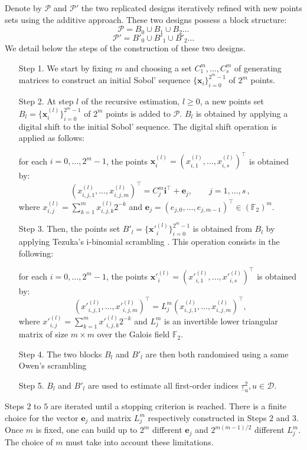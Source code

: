 \documentclass[]{elsarticle}
\theoremstyle{definition}
\newcommand{\bvec}[1]{\boldsymbol{#1}}
\newcommand{\vx}{\bvec{x}}
\newcommand{\vi}{\bvec{i}}
\newcommand{\ve}{\bvec{e}}
\begin{document}
Denote by $\mathcal{P}$ and $\mathcal{P}'$ the two replicated designs iteratively refined with new points sets using the additive approach. These two designs possess a block structure:
$$\mathcal{P}= B_0 \cup B_1 \cup B_2 \dots $$
$$\mathcal{P}'= {B'}_0 \cup {B'}_1 \cup {B'}_2 \dots $$
We detail below the steps of the construction of these two designs.
\begin{enumerate}
\item[Step 1.] We start by fixing $m$ and choosing a set $C_1^{m},\dots,C_s^{m}$ of generating matrices to construct an initial Sobol' sequence $\{\vx_i\}_{i=0}^{2^m-1}$ of $2^m$ points. \\

\item[Step 2.] At step $l$ of the recursive estimation, $l \geq 0$, a new points set $B_l=\{\vx_i^{(l)}\}_{i=0}^{2^m-1}$ of $2^m$ points is added to $\mathcal{P}$. $B_l$ is obtained by applying a digital shift to the initial Sobol' sequence. The digital shift operation is applied as follows:

for each $i=0,\dots,2^m-1$, the points $\vx_i^{(l)} = (x_{i,1}^{(l)},\dots,x_{i,s}^{(l)})^\intercal$ is obtained by:
\begin{equation}
\label{dig.shift}
(x_{i,j,1}^{(l)},\dots,x_{i,j,m}^{(l)})^\intercal = C_j^m \vi^\intercal+\ve_j,\qquad j= 1,\dots,s\, ,
\end{equation}
where $ x_{i,j}^{(l)}=\sum_{k = 1}^mx_{i,j,k}^{(l)}2^{-k}$ and $\ve_j=(e_{j,{0}},\dots,e_{j,{m-1}})^\intercal \in (\mathbb{F}_2)^m$.\\

\item[Step 3.] Then, the points set ${B'}_l=\{{\vx'}_i^{(l)}\}_{i=0}^{2^m-1}$ is obtained from $B_l$ by applying Tezuka's i-binomial scrambling \cite{tezuka}. This operation consists in the following: 

for each $i=0,\dots,2^m-1$, the points ${\vx'}_i^{(l)} = ({x'}_{i,1}^{(l)},\dots,{x'}_{i,s}^{(l)})^\intercal$ is obtained by:
\begin{equation}
\label{ibinom.scrambling}
({x'}_{i,j,1}^{(l)},\dots,{x'}_{i,j,m}^{(l)})^\intercal = L_j^m (x_{i,j,1}^{(l)},\dots,x_{i,j,m}^{(l)})^\intercal,
\end{equation}
where $ {x'}_{i,j}^{(l)}=\sum_{k = 1}^m{x'}_{i,j,k}^{(l)}2^{-k}$ and $L_j^m$ is an invertible lower triangular matrix of size $m \times m$ over the Galois field $\mathbb{F}_2$.\\

\item[Step 4.] The two blocks $B_l$ and ${B'}_l$ are then both randomised using a same Owen's scrambling \cite{owen.scrambl}

\item[Step 5.] $B_l$ and ${B'}_l$ are used to estimate all first-order indices $\underline{\tau}_u^2, u \in \mathcal{D}$.
\end{enumerate}
Steps $2$ to $5$ are iterated until a stopping criterion is reached. There is a finite choice for the vector $\ve_j$ and matrix $L_j^m$ respectively constructed in Steps $2$ and $3$. Once $m$ is fixed, one can build up to $2^m$ different $\ve_j$ and $2^{m(m-1)/2}$ different $L_j^m$. The choice of $m$ must take into account these limitations.
\end{document}
